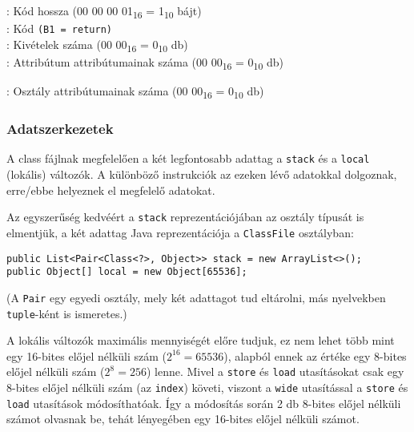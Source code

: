 \begin{compactitem}
\begin{compactitem}
\begin{compactitem}
\begin{compactitem}
                : Kód hossza (00 00 00 01\textsubscript{16} = 1\textsubscript{10} bájt) \\
                : Kód \lstinline{(B1 = return)}  \\
                : Kivételek száma (00 00\textsubscript{16} = 0\textsubscript{10} db) \\
                : Attribútum attribútumainak száma (00 00\textsubscript{16} = 0\textsubscript{10} db)
        \end{compactitem}
    \end{compactitem}
\end{compactitem}
\item {}: Osztály attribútumainak száma (00 00\textsubscript{16} = 0\textsubscript{10} db)
\end{compactitem}

\subsubsection{Adatszerkezetek}

A class fájlnak megfelelően a két legfontosabb adattag a \lstinline{stack} és a \lstinline{local} (lokális) változók. A különböző instrukciók az ezeken lévő adatokkal dolgoznak, erre/ebbe helyeznek el megfelelő adatokat.

Az egyszerűség kedvéért a \lstinline{stack} reprezentációjában az osztály típusát is elmentjük, a két adattag Java reprezentációja a \lstinline{ClassFile} osztályban:
\begin{verbatim}
public List<Pair<Class<?>, Object>> stack = new ArrayList<>();
public Object[] local = new Object[65536];
\end{verbatim}
(A \lstinline{Pair} egy egyedi osztály, mely két adattagot tud eltárolni, más nyelvekben \lstinline{tuple}-ként is ismeretes.)

A lokális változók maximális mennyiségét előre tudjuk, ez nem lehet több mint egy 16-bites előjel nélküli szám ($2^{16} = 65536$), alapból ennek az értéke egy 8-bites előjel nélküli szám ($2^8 = 256$) lenne. Mivel a \lstinline{store} és \lstinline{load} utasításokat csak egy 8-bites előjel nélküli szám (az \lstinline{index}) követi, viszont a \lstinline{wide} utasítással a \lstinline{store} és \lstinline{load} utasítások módosíthatóak. Így a módosítás során 2 db 8-bites előjel nélküli számot olvasnak be, tehát lényegében egy 16-bites előjel nélküli számot.

